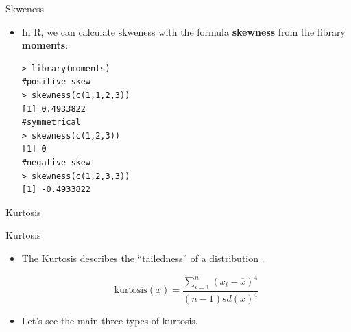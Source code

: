 \documentclass[handout]{beamer}
\begin{document}
\begin{frame}[fragile]{Skweness}

\scriptsize{
\begin{itemize} 
 \item In R, we can calculate skweness with the formula \textbf{skewness} from the library \textbf{moments}:
 
 \begin{verbatim}
> library(moments)
#positive skew
> skewness(c(1,1,2,3)) 
[1] 0.4933822
#symmetrical
> skewness(c(1,2,3)) 
[1] 0
#negative skew
> skewness(c(1,2,3,3)) 
[1] -0.4933822
 \end{verbatim}

 
 
\end{itemize}

}



 
\end{frame}


\begin{frame}{Kurtosis}
\scriptsize{


\begin{block}{Kurtosis}
\begin{itemize}
 \item The Kurtosis  describes the ``tailedness'' of a distribution \cite{westfall2014kurtosis}. 
 
  \begin{displaymath}
  \text{kurtosis}(x) = \frac{\sum_{i=1}^{n}(x_i-\overline{x})^4}{(n-1)sd(x)^4}
 \end{displaymath}
 
  \item  Let's see the main three types of kurtosis.
 

 
 
\end{itemize}



\end{block}


}
 
\end{frame}
\end{document}
